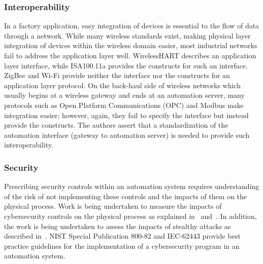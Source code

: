     \subsubsection{Interoperability}
    In a factory application, easy integration of devices is essential to  the flow of data through a network. While many wireless standards exist, making physical layer integration of devices within the wireless domain easier, most industrial networks fail to address the application layer well.  WirelessHART describes an application layer interface, while ISA100.11a provides the constructs for such an interface.  ZigBee and Wi-Fi provide neither the interface nor the constructs for an application layer protocol. On the back-haul side of wireless networks which usually begins at a wireless gateway and ends at an automation server, many protocols such as Open Platform Communications (OPC) and Modbus make integration easier; however, again, they fail to specify the interface but instead provide the constructs.  The authors assert that a standardization of the automation interface (gateway to automation server) is needed to provide such interoperability. 
    
    \subsubsection{Security}
    Prescribing security controls within an automation system requires understanding of the risk of not implementing these controls and the impacts of them on the physical process. Work is being undertaken to measure the impacts of cybersecurity controls on the physical process as explained in~\cite{candell2015industrial} and~\cite{candell2015measuring}. In addition, the work is being undertaken to assess the impacts of stealthy attacks as described in~\cite{urbina2016limiting}. NIST Special Publication 800-82 and IEC-62443 provide best practice guidelines for the implementation of a cybersecurity program in an automation system.
    
